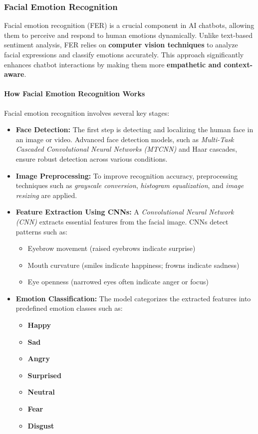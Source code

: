 \documentclass[a4paper,10pt]{article}
\begin{document}
\subsubsection{Facial Emotion Recognition}
Facial emotion recognition (FER) is a crucial component in AI chatbots, allowing them to perceive and respond to human emotions dynamically. Unlike text-based sentiment analysis, FER relies on \textbf{computer vision techniques} to analyze facial expressions and classify emotions accurately. This approach significantly enhances chatbot interactions by making them more \textbf{empathetic and context-aware}.

\paragraph{How Facial Emotion Recognition Works}
Facial emotion recognition involves several key stages:

\begin{itemize}
    \item \textbf{Face Detection:} The first step is detecting and localizing the human face in an image or video. Advanced face detection models, such as \textit{Multi-Task Cascaded Convolutional Neural Networks (MTCNN)} and Haar cascades, ensure robust detection across various conditions.
    
    \item \textbf{Image Preprocessing:} To improve recognition accuracy, preprocessing techniques such as \textit{grayscale conversion}, \textit{histogram equalization}, and \textit{image resizing} are applied.
    
    \item \textbf{Feature Extraction Using CNNs:} A \textit{Convolutional Neural Network (CNN)} extracts essential features from the facial image. CNNs detect patterns such as:
    \begin{itemize}
        \item Eyebrow movement (raised eyebrows indicate surprise)
        \item Mouth curvature (smiles indicate happiness; frowns indicate sadness)
        \item Eye openness (narrowed eyes often indicate anger or focus)
    \end{itemize}
    
    \item \textbf{Emotion Classification:} The model categorizes the extracted features into predefined emotion classes such as:
    \begin{itemize}
        \item \textbf{Happy }
        \item \textbf{Sad }
        \item \textbf{Angry }
        \item \textbf{Surprised }
        \item \textbf{Neutral }
        \item \textbf{Fear }
        \item \textbf{Disgust }
    \end{itemize}
\end{itemize}
\end{document}
